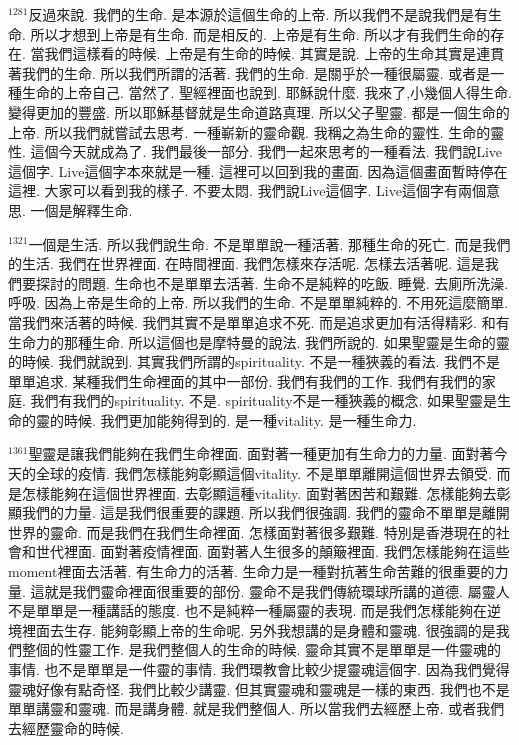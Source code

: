 \documentclass{book}
\begin{document}
$^{1281}$反過來說.
我們的生命.
是本源於這個生命的上帝.
所以我們不是說我們是有生命.
所以才想到上帝是有生命.
而是相反的.
上帝是有生命.
所以才有我們生命的存在.
當我們這樣看的時候.
上帝是有生命的時候.
其實是說.
上帝的生命其實是連貫著我們的生命.
所以我們所謂的活著.
我們的生命.
是關乎於一種很屬靈.
或者是一種生命的上帝自己.
當然了.
聖經裡面也說到.
耶穌說什麼.
我來了,小幾個人得生命.
變得更加的豐盛.
所以耶穌基督就是生命道路真理.
所以父子聖靈.
都是一個生命的上帝.
所以我們就嘗試去思考.
一種嶄新的靈命觀.
我稱之為生命的靈性.
生命的靈性.
這個今天就成為了.
我們最後一部分.
我們一起來思考的一種看法.
我們說Live這個字.
Live這個字本來就是一種.
這裡可以回到我的畫面.
因為這個畫面暫時停在這裡.
大家可以看到我的樣子.
不要太悶.
我們說Live這個字.
Live這個字有兩個意思.
一個是解釋生命.

$^{1321}$一個是生活.
所以我們說生命.
不是單單說一種活著.
那種生命的死亡.
而是我們的生活.
我們在世界裡面.
在時間裡面.
我們怎樣來存活呢.
怎樣去活著呢.
這是我們要探討的問題.
生命也不是單單去活著.
生命不是純粹的吃飯.
睡覺.
去廁所洗澡.
呼吸.
因為上帝是生命的上帝.
所以我們的生命.
不是單單純粹的.
不用死這麼簡單.
當我們來活著的時候.
我們其實不是單單追求不死.
而是追求更加有活得精彩.
和有生命力的那種生命.
所以這個也是摩特曼的說法.
我們所說的.
如果聖靈是生命的靈的時候.
我們就說到.
其實我們所謂的spirituality.
不是一種狹義的看法.
我們不是單單追求.
某種我們生命裡面的其中一部份.
我們有我們的工作.
我們有我們的家庭.
我們有我們的spirituality.
不是.
spirituality不是一種狹義的概念.
如果聖靈是生命的靈的時候.
我們更加能夠得到的.
是一種vitality.
是一種生命力.

$^{1361}$聖靈是讓我們能夠在我們生命裡面.
面對著一種更加有生命力的力量.
面對著今天的全球的疫情.
我們怎樣能夠彰顯這個vitality.
不是單單離開這個世界去領受.
而是怎樣能夠在這個世界裡面.
去彰顯這種vitality.
面對著困苦和艱難.
怎樣能夠去彰顯我們的力量.
這是我們很重要的課題.
所以我們很強調.
我們的靈命不單單是離開世界的靈命.
而是我們在我們生命裡面.
怎樣面對著很多艱難.
特別是香港現在的社會和世代裡面.
面對著疫情裡面.
面對著人生很多的顛簸裡面.
我們怎樣能夠在這些moment裡面去活著.
有生命力的活著.
生命力是一種對抗著生命苦難的很重要的力量.
這就是我們靈命裡面很重要的部份.
靈命不是我們傳統環球所講的道德.
屬靈人不是單單是一種講話的態度.
也不是純粹一種屬靈的表現.
而是我們怎樣能夠在逆境裡面去生存.
能夠彰顯上帝的生命呢.
另外我想講的是身體和靈魂.
很強調的是我們整個的性靈工作.
是我們整個人的生命的時候.
靈命其實不是單單是一件靈魂的事情.
也不是單單是一件靈的事情.
我們環教會比較少提靈魂這個字.
因為我們覺得靈魂好像有點奇怪.
我們比較少講靈.
但其實靈魂和靈魂是一樣的東西.
我們也不是單單講靈和靈魂.
而是講身體.
就是我們整個人.
所以當我們去經歷上帝.
或者我們去經歷靈命的時候.
\end{document}
